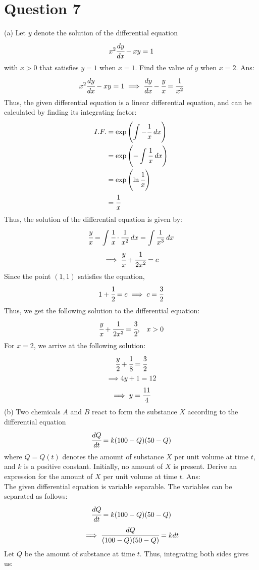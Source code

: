 \documentclass{article}
\begin{document}
\section*{Question 7}
(a) Let $y$ denote the solution of the differential equation
$$x^2 \cfrac{dy}{dx}- xy = 1$$
with $x > 0$ that satisfies $y = 1$ when $x = 1$. Find the value of $y$ when $x = 2$. 
\newline
\newline
Ans:
$$x^2 \cfrac{dy}{dx}- xy = 1 \implies \cfrac{dy}{dx} - \cfrac{y}{x} = \cfrac{1}{x^2}$$
Thus, the given differential equation is a linear differential equation, and can be calculated by finding its integrating factor:
\begin{align*}
    I.F.
    &= \exp{\left(\displaystyle\int - \cfrac{1}{x} \; dx\right)} \\
    &= \exp{\left(-\displaystyle\int \cfrac{1}{x} \; dx\right)} \\
    &= \exp{\left(\ln \cfrac{1}{x}\right)} \\
    &= \cfrac{1}{x}
\end{align*}
Thus, the solution of the differential equation is given by:
$$\cfrac{y}{x} = \displaystyle\int \cfrac{1}{x} \cdot \cfrac{1}{x^2} \; dx = \displaystyle\int \cfrac{1}{x^3} \; dx$$
$$\implies \cfrac{y}{x} + \cfrac{1}{2x^2} =  c$$
Since the point $(1,1)$ satisfies the equation, 
$$1 + \cfrac{1}{2} = c \implies c = \cfrac{3}{2}$$
Thus, we get the following solution to the differential equation:
$$\cfrac{y}{x} + \cfrac{1}{2x^2} = \cfrac{3}{2}, \;\;\; x > 0$$
For $x = 2$, we arrive at the following solution:
$$\cfrac{y}{2} + \cfrac{1}{8} = \cfrac{3}{2}$$
$$\implies 4y + 1 = 12$$
$$\implies y = \cfrac{11}{4}$$
\newline
\newline
(b) Two chemicals $A$ and $B$ react to form the substance $X$ according to the differential equation
$$\cfrac{dQ}{dt} = k(100 - Q)(50 - Q) $$
where $Q = Q(t)$ denotes the amount of substance $X$ per unit volume at time $t$, and $k$ is a positive constant. Initially, no amount of $X$ is present. Derive an expression for the amount of $X$ per unit volume at time $t$.
\newline
\newline
Ans:
\\ The given differential equation is variable separable. The variables can be separated as follows:
$$\cfrac{dQ}{dt} = k(100 - Q)(50 - Q) $$
$$\implies \cfrac{dQ}{(100 - Q)(50 - Q)} = kdt $$
Let $Q$ be the amount of substance at time $t$. Thus, integrating both sides gives us:
\end{document}
